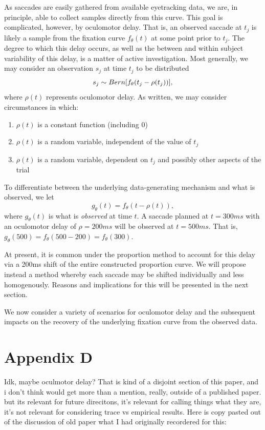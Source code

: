 \documentclass{article}
\begin{document}
As saccades are easily gathered from available eyetracking data, we are, in principle, able to collect samples directly from this curve. This goal is complicated, however, by oculomotor delay. That is, an observed saccade at $t_j$ is likely a sample from the fixation curve $f_{\theta}(t)$ at some point prior to $t_j$. The degree to which this delay occurs, as well as the between and within subject variability of this delay, is a matter of active investigation. Most generally, we may consider an observation $s_j$ at time $t_j$ to be distributed
$$
s_j \sim  Bern \large[f_{\theta}(t_j - \rho(t_j)) \large],
$$ 
where $\rho(t)$ represents oculomotor delay. As written, we may consider circumstances in which:

\begin{enumerate}
\item $\rho(t)$ is a constant function (including 0)
\item $\rho(t)$ is a random variable, independent of the value of $t_j$
\item $\rho(t)$ is a random variable, dependent on $t_j$ and possibly other aspects of the trial
\end{enumerate}

To differentiate between the underlying data-generating mechanism and what is observed, we let
$$
g_{\theta}(t) = f_{\theta}(t - \rho(t)), 
$$
where $g_{\theta}(t)$ is what is \textit{observed} at time $t$. A saccade planned at $t = 300ms$ with an oculomotor delay of $\rho = 200ms$ will be observed at $t = 500ms$. That is, $g_{\theta}(500) = f_{\theta}(500 - 200) = f_{\theta}(300)$.

At present, it is common under the proportion method to account for this delay via a 200ms shift of the entire constructed proportion curve. We will propose instead a method whereby each saccade may be shifted individually and less homogenously. Reasons and implications for this will be presented in the next section.

We now consider a variety of scenarios for oculomotor delay and the subsequent impacts on the recovery of the underlying fixation curve from the observed data.

\section*{Appendix D}

Idk, maybe oculmotor delay? That is kind of a disjoint section of this paper, and i don't think would get more than a mention, really, outside of a published paper. but its relevant for future direcitons, it's relevant for calling things what they are, it's not relevant for considering trace vs empirical results. Here is copy pasted out of the discussion of old paper what I had originally recordered for this:
\end{document}

